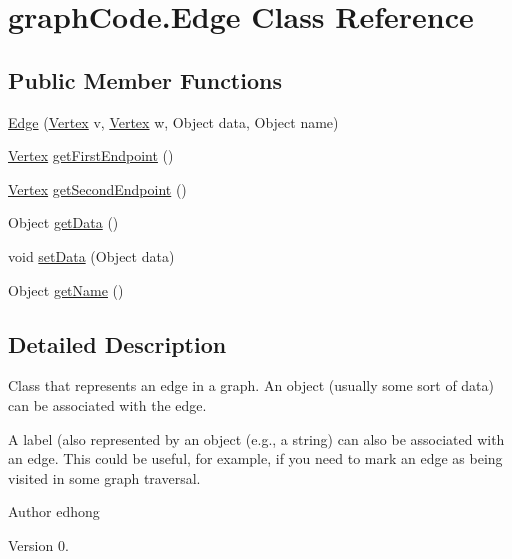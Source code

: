 \hypertarget{classgraphCode_1_1Edge}{}\section{graph\+Code.\+Edge Class Reference}
\label{classgraphCode_1_1Edge}
\subsection*{Public Member Functions}
\begin{DoxyCompactItemize}
\item 
\hyperlink{classgraphCode_1_1Edge_af42116abc370a0421b529b8d2a1c0d23}{Edge} (\hyperlink{classgraphCode_1_1Vertex}{Vertex} v, \hyperlink{classgraphCode_1_1Vertex}{Vertex} w, Object data, Object name)
\item 
\hyperlink{classgraphCode_1_1Vertex}{Vertex} \hyperlink{classgraphCode_1_1Edge_aa2e3d12b5f250a7c328319238c259f6b}{get\+First\+Endpoint} ()
\item 
\hyperlink{classgraphCode_1_1Vertex}{Vertex} \hyperlink{classgraphCode_1_1Edge_a15ca063bcb0b6163a167407d67d3e7aa}{get\+Second\+Endpoint} ()
\item 
Object \hyperlink{classgraphCode_1_1Edge_a6b1ab8fe927bc8ab075e017b16e39181}{get\+Data} ()
\item 
void \hyperlink{classgraphCode_1_1Edge_ae62937229948e8edcfbd5b1e54a833a2}{set\+Data} (Object data)
\item 
Object \hyperlink{classgraphCode_1_1Edge_aa706434e463cc27aade24c53a0d0f375}{get\+Name} ()
\end{DoxyCompactItemize}


\subsection{Detailed Description}
Class that represents an edge in a graph. An object (usually some sort of data) can be associated with the edge.

A label (also represented by an object (e.\+g., a string) can also be associated with an edge. This could be useful, for example, if you need to mark an edge as being visited in some graph traversal.

\begin{DoxyAuthor}{Author}
edhong 
\end{DoxyAuthor}
\begin{DoxyVersion}{Version}
0. 
\end{DoxyVersion}


